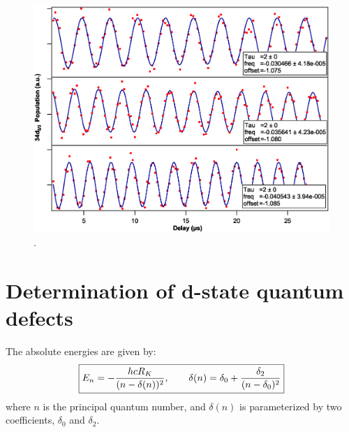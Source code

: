 \documentclass[landscape]{sciposter}
\begin{document}
\begin{multicols}{4}
\begin{figure}
\includegraphics[scale = 1]{data68-67-69.eps}
\caption{.}
\label{Ramsey}
\end{figure}


\section*{\large Determination of d-state quantum defects}
The absolute energies are given by:
\begin{align*}
\boxed{E_n = -\frac{hcR_K}{(n - \delta(n))^2}, \hspace{0.7cm} \delta(n) = \delta_0 + \frac{\delta_2}{(n-\delta_0)^2}}
\end{align*}
where $n$ is the principal quantum number, and $\delta(n)$ is parameterized by two coefficients, $\delta_0$ and $\delta_2$.



\end{multicols}
\end{document}
